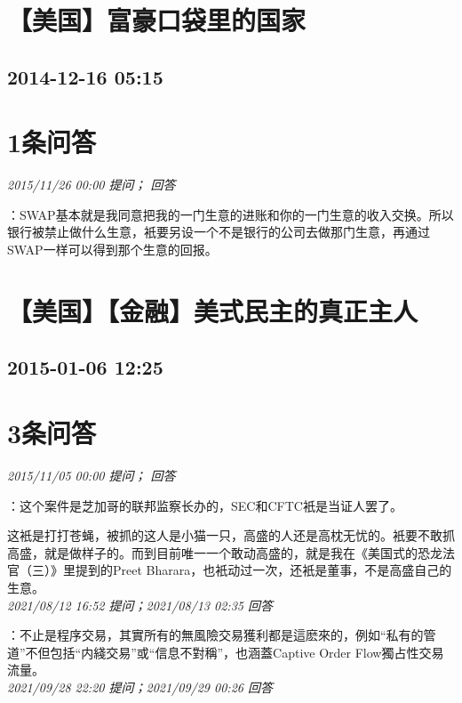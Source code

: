 \documentclass[twocolumn]{ctexart}
\begin{document}
\section{【美国】富豪口袋里的国家}
\subsection{2014-12-16 05:15}


\section{1条问答}

\textit{\hfill\noindent\small 2015/11/26 00:00 提问； 回答}

：SWAP基本就是我同意把我的一门生意的进账和你的一门生意的收入交换。所以银行被禁止做什么生意，衹要另设一个不是银行的公司去做那门生意，再通过SWAP一样可以得到那个生意的回报。\\


\section{【美国】【金融】美式民主的真正主人}
\subsection{2015-01-06 12:25}


\section{3条问答}

\textit{\hfill\noindent\small 2015/11/05 00:00 提问； 回答}

：这个案件是芝加哥的联邦监察长办的，SEC和CFTC衹是当证人罢了。

这衹是打打苍蝇，被抓的这人是小猫一只，高盛的人还是高枕无忧的。衹要不敢抓高盛，就是做样子的。而到目前唯一一个敢动高盛的，就是我在《美国式的恐龙法官（三）》里提到的Preet Bharara，也衹动过一次，还衹是董事，不是高盛自己的生意。\\

\textit{\hfill\noindent\small 2021/08/12 16:52 提问；2021/08/13 02:35 回答}

：不止是程序交易，其實所有的無風險交易獲利都是這麽來的，例如“私有的管道”不但包括“内綫交易”或“信息不對稱”，也涵蓋Captive Order Flow獨占性交易流量。
\\

\textit{\hfill\noindent\small 2021/09/28 22:20 提问；2021/09/29 00:26 回答}
\end{document}
